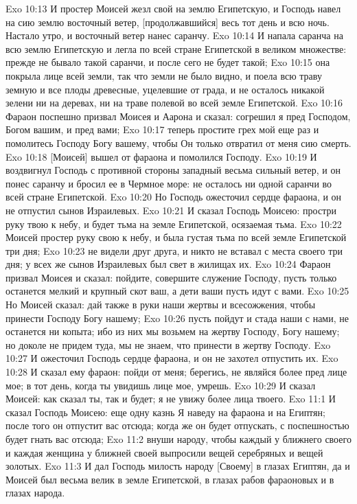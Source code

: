 Exo 10:13  И простер Моисей жезл свой на землю Египетскую, и Господь навел на сию землю восточный ветер, [продолжавшийся] весь тот день и всю ночь. Настало утро, и восточный ветер нанес саранчу.
Exo 10:14  И напала саранча на всю землю Египетскую и легла по всей стране Египетской в великом множестве: прежде не бывало такой саранчи, и после сего не будет такой;
Exo 10:15  она покрыла лице всей земли, так что земли не было видно, и поела всю траву земную и все плоды древесные, уцелевшие от града, и не осталось никакой зелени ни на деревах, ни на траве полевой во всей земле Египетской.
Exo 10:16  Фараон поспешно призвал Моисея и Аарона и сказал: согрешил я пред Господом, Богом вашим, и пред вами;
Exo 10:17  теперь простите грех мой еще раз и помолитесь Господу Богу вашему, чтобы Он только отвратил от меня сию смерть.
Exo 10:18  [Моисей] вышел от фараона и помолился Господу.
Exo 10:19  И воздвигнул Господь с противной стороны западный весьма сильный ветер, и он понес саранчу и бросил ее в Чермное море: не осталось ни одной саранчи во всей стране Египетской.
Exo 10:20  Но Господь ожесточил сердце фараона, и он не отпустил сынов Израилевых.
Exo 10:21  И сказал Господь Моисею: простри руку твою к небу, и будет тьма на земле Египетской, осязаемая тьма.
Exo 10:22  Моисей простер руку свою к небу, и была густая тьма по всей земле Египетской три дня;
Exo 10:23  не видели друг друга, и никто не вставал с места своего три дня; у всех же сынов Израилевых был свет в жилищах их.
Exo 10:24  Фараон призвал Моисея и сказал: пойдите, совершите служение Господу, пусть только останется мелкий и крупный скот ваш, а дети ваши пусть идут с вами.
Exo 10:25  Но Моисей сказал: дай также в руки наши жертвы и всесожжения, чтобы принести Господу Богу нашему;
Exo 10:26  пусть пойдут и стада наши с нами, не останется ни копыта; ибо из них мы возьмем на жертву Господу, Богу нашему; но доколе не придем туда, мы не знаем, что принести в жертву Господу.
Exo 10:27  И ожесточил Господь сердце фараона, и он не захотел отпустить их.
Exo 10:28  И сказал ему фараон: пойди от меня; берегись, не являйся более пред лице мое; в тот день, когда ты увидишь лице мое, умрешь.
Exo 10:29  И сказал Моисей: как сказал ты, так и будет; я не увижу более лица твоего.
Exo 11:1  И сказал Господь Моисею: еще одну казнь Я наведу на фараона и на Египтян; после того он отпустит вас отсюда; когда же он будет отпускать, с поспешностью будет гнать вас отсюда;
Exo 11:2  внуши народу, чтобы каждый у ближнего своего и каждая женщина у ближней своей выпросили вещей серебряных и вещей золотых.
Exo 11:3  И дал Господь милость народу [Своему] в глазах Египтян, да и Моисей был весьма велик в земле Египетской, в глазах рабов фараоновых и в глазах народа.
